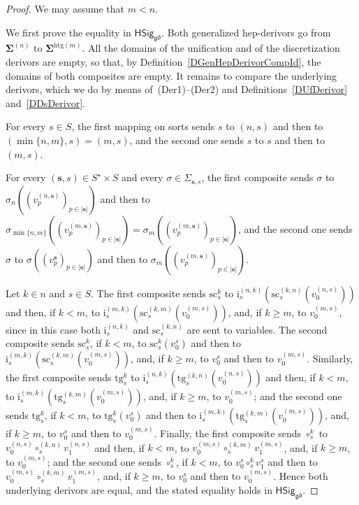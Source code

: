 \documentclass[a4paper, reqno]{amsbook}
\newcommand{\bb}[1]{\ensuremath{\lvert #1 \rvert}}
\newcommand{\sig}[1]{\mathbf{#1}}             %
\newcommand{\gd}{\mathfrak{gd}}              %
\newcommand{\htg}{\mathrm{htg}}                %
\newcommand{\src}{\mathrm{sc}}
\newcommand{\tgt}{\mathrm{tg}}
\theoremstyle{plain}
\theoremstyle{definition}
\begin{document}
\begin{proof}
We may assume that $m<n$.

We first prove the equality in $\mathsf{HSig}_{\gd}$.
Both generalized hep-derivors go from $\sig{\Sigma}^{(n)}$ to $\sig{\Sigma}^{\htg(m)}$.
All the domains of the unification and of the discretization derivors are empty, so that, by Definition~\ref{DGenHepDerivorCompId}, the domains of both composites are empty.
It remains to compare the underlying derivors, which we do by means of~(Der1)--(Der2) and Definitions~\ref{DUfDerivor} and~\ref{DDsDerivor}.

For every $s\in S$, the first mapping on sorts sends $s$ to $(n,s)$ and then to $(\min\{n,m\},s)=(m,s)$, and the second one sends $s$ to $s$ and then to $(m,s)$.

For every $(\mathbf{s},s)\in S^{\star}\times S$ and every $\sigma\in\Sigma_{\mathbf{s},s}$, the first composite sends $\sigma$ to $\sigma_{n}((v^{(n,\mathbf{s})}_{p})_{p\in\bb{\mathbf{s}}})$ and then to $\sigma_{\min\{n,m\}}((v^{(m,\mathbf{s})}_{p})_{p\in\bb{\mathbf{s}}})=\sigma_{m}((v^{(m,\mathbf{s})}_{p})_{p\in\bb{\mathbf{s}}})$, and the second one sends $\sigma$ to $\sigma((v^{\mathbf{s}}_{p})_{p\in\bb{\mathbf{s}}})$ and then to $\sigma_{m}((v^{(m,\mathbf{s})}_{p})_{p\in\bb{\mathbf{s}}})$.

Let $k\in n$ and $s\in S$.
The first composite sends $\src^{k}_{s}$ to $\mathrm{i}^{(n,k)}_{s}(\src^{(k,n)}_{s}(v^{(n,s)}_{0}))$ and then, if $k<m$, to $\mathrm{i}^{(m,k)}_{s}(\src^{(k,m)}_{s}(v^{(m,s)}_{0}))$, and, if $k\geq m$, to $v^{(m,s)}_{0}$, since in this case both $\mathrm{i}^{(n,k)}_{s}$ and $\src^{(k,n)}_{s}$ are sent to variables.
The second composite sends $\src^{k}_{s}$, if $k<m$, to $\src^{k}_{s}(v^{s}_{0})$ and then to $\mathrm{i}^{(m,k)}_{s}(\src^{(k,m)}_{s}(v^{(m,s)}_{0}))$, and, if $k\geq m$, to $v^{s}_{0}$ and then to $v^{(m,s)}_{0}$.
Similarly, the first composite sends $\tgt^{k}_{s}$ to $\mathrm{i}^{(n,k)}_{s}(\tgt^{(k,n)}_{s}(v^{(n,s)}_{0}))$ and then, if $k<m$, to $\mathrm{i}^{(m,k)}_{s}(\tgt^{(k,m)}_{s}(v^{(m,s)}_{0}))$, and, if $k\geq m$, to $v^{(m,s)}_{0}$; and the second one sends $\tgt^{k}_{s}$, if $k<m$, to $\tgt^{k}_{s}(v^{s}_{0})$ and then to $\mathrm{i}^{(m,k)}_{s}(\tgt^{(k,m)}_{s}(v^{(m,s)}_{0}))$, and, if $k\geq m$, to $v^{s}_{0}$ and then to $v^{(m,s)}_{0}$.
Finally, the first composite sends $\circ^{k}_{s}$ to $v^{(n,s)}_{0}\circ^{(k,n)}_{s}v^{(n,s)}_{1}$ and then, if $k<m$, to $v^{(m,s)}_{0}\circ^{(k,m)}_{s}v^{(m,s)}_{1}$, and, if $k\geq m$, to $v^{(m,s)}_{0}$; and the second one sends $\circ^{k}_{s}$, if $k<m$, to $v^{s}_{0}\circ^{k}_{s}v^{s}_{1}$ and then to $v^{(m,s)}_{0}\circ^{(k,m)}_{s}v^{(m,s)}_{1}$, and, if $k\geq m$, to $v^{s}_{0}$ and then to $v^{(m,s)}_{0}$.
Hence both underlying derivors are equal, and the stated equality holds in $\mathsf{HSig}_{\gd}$.


\end{proof}
\end{document}
